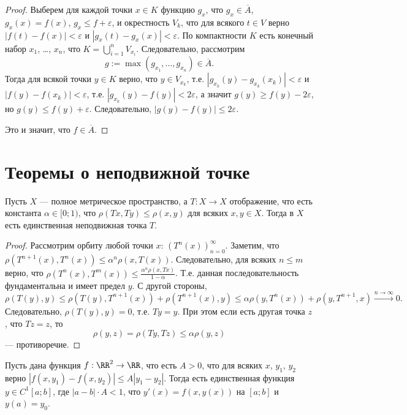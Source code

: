 \documentclass[12pt,a4paper]{article}
\begin{document}
\begin{proof}
        Выберем для каждой точки $x \in K$ функцию $g_x$, что $g_x \in \overline{A}$, $g_x(x) = f(x)$, $g_x \leqslant f + \varepsilon$, и окрестность $V_k$, что для всякого $t \in V$ верно $|f(t) - f(x)| < \varepsilon$ и $|g_x(t) - g_x(x)| < \varepsilon$. По компактности $K$ есть конечный набор $x_1$, \dots, $x_n$, что $K = \bigcup_{i=1}^n V_{x_i}$. Следовательно, рассмотрим
        \[g := \max(g_{x_1}, \dots, g_{x_n}) \in \overline{A}.\]
        Тогда для всякой точки $y \in K$ верно, что $y \in V_{x_k}$, т.е. $|g_{x_k}(y) - g_{x_k}(x_k)| < \varepsilon$ и $|f(y) - f(x_k)| < \varepsilon$, т.е. $|g_{x_k}(y) - f(y)| < 2\varepsilon$, а значит $g(y) \geqslant f(y) - 2\varepsilon$, но $g(y) \leqslant f(y) + \varepsilon$. Следовательно, $|g(y) - f(y)| \leqslant 2\varepsilon$.

        Это и значит, что $f \in \overline{A}$.
    \end{proof}

    \section{Теоремы о неподвижной точке}

    \begin{theorem}
        Пусть $X$ --- полное метрическое пространство, а $T: X \to X$ отображение, что есть константа $\alpha \in [0; 1)$, что $\rho(Tx, Ty) \leqslant \rho(x, y)$ для всяких $x, y \in X$. Тогда в $X$ есть единственная неподвижная точка $T$.
    \end{theorem}

    \begin{proof}
        Рассмотрим орбиту любой точки $x$: $(T^n(x))_{n=0}^\infty$. Заметим, что $\rho(T^{n+1}(x), T^n(x)) \leqslant \alpha^n \rho(x, T(x))$. Следовательно, для всяких $n \leqslant m$ верно, что $\rho(T^n(x), T^m(x)) \leqslant \frac{\alpha^n \rho(x, Tx)}{1 - \alpha}$. Т.е. данная последовательность фундаментальна и имеет предел $y$. С другой стороны,
        \[
            \rho(T(y), y)
            \leqslant \rho(T(y), T^{n+1}(x)) + \rho(T^{n+1}(x), y)
            \leqslant \alpha \rho(y, T^n(x)) + \rho(y, T^{n+1}, x)
            \mathbin{\overset{n \to \infty}{\longrightarrow}} 0.
        \]
        Следовательно, $\rho(T(y), y) = 0$, т.е. $Ty = y$. При этом если есть другая точка $z$, что $Tz = z$, то
        \[\rho(y, z) = \rho(Ty, Tz) \leqslant \alpha \rho(y, z)\]
        --- противоречие.
    \end{proof}

    \begin{lemma}
        Пусть дана функция $f: \RR^2 \to \RR$, что есть $A > 0$, что для всяких $x$, $y_1$, $y_2$ верно $|f(x, y_1) - f(x, y_2)| \leqslant A |y_1 - y_2|$. Тогда есть единственная функция $y \in C^1[a; b]$, где $|a-b| \cdot A < 1$, что $y'(x) = f(x, y(x))$ на $[a; b]$ и $y(a) = y_0$.
    \end{lemma}
\end{document}
